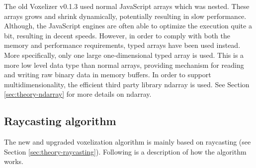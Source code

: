 The old Voxelizer v0.1.3 used normal JavaScript arrays which was nested. These arrays grows and shrink dynamically, potentially resulting in slow performance. Although, the JavaScript engines are often able to optimize the execution quite a bit, resulting in decent speeds. However, in order to comply with both the memory and performance requirements, typed arrays have been used instead. More specifically, only one large one-dimensional typed array is used. This is a more low level data type than normal arrays, providing mechanism for reading and writing raw binary data in memory buffers. In order to support multidimensionality, the efficient third party library ndarray is used. See Section \ref{sec:theory-ndarray} for more details on ndarray.

\subsection{Raycasting algorithm}
\label{sec:method-raycasting-algorithm}
The new and upgraded voxelization algorithm is mainly based on raycasting (see Section \ref{sec:theory-raycasting}). Following is a description of how the algorithm works.

